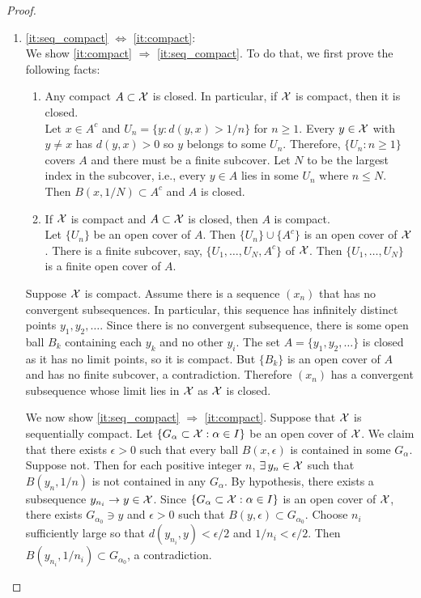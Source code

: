 \documentclass[12pt]{article}
\begin{document}
\begin{proof}
\begin{enumerate}[1)]
\item \ref{it:seq_compact} $\Leftrightarrow$ \ref{it:compact}:\\
We show \ref{it:compact} $\Rightarrow$ \ref{it:seq_compact}. To do that, we first prove the following facts:
\begin{enumerate}
	\item Any compact $A \subset \mathcal{X}$ is closed. In particular, if $\mathcal{X}$ is compact, then it is closed.\\
	Let $x\in A^c$ and $U_n = \{y : d(y,x) > 1/n\}$ for $n\geq 1$. Every $y\in\mathcal{X}$ with $y\ne x$ has $d(y,x)>0$ so $y$ belongs to some $U_n$. Therefore, $\{U_n : n\geq 1\}$ covers $A$ and there must be a finite subcover. Let $N$ to be the largest index in the subcover, i.e., every $y\in A$ lies in some $U_n$ where $n\leq N$. Then $B(x,1/N) \subset A^c$ and $A$ is closed.
	\item If $\mathcal{X}$ is compact and $A\subset\mathcal{X}$ is closed, then $A$ is compact.\\
	Let $\{U_n\}$ be an open cover of $A$. Then $\{U_n\}\cup\{ A^c\}$ is an open cover of $\mathcal{X}$. There is a finite subcover, say, $\{U_1,\ldots,U_N,A^c\}$ of $\mathcal{X}$. Then $\{U_1,\ldots,U_N\}$ is a finite open cover of $A$.
\end{enumerate}
Suppose $\mathcal{X}$ is compact. Assume there is a sequence $(x_n)$ that has no convergent subsequences. In particular, this sequence has infinitely distinct points $y_1, y_2, \ldots$. Since there is no convergent subsequence, there is some open ball $B_k$ containing each $y_k$ and no other $y_i$. The set $A=\{y_1,y_2,\ldots\}$ is closed as it has no limit points, so it is compact. But $\{B_k\}$ is an open cover of $A$ and has no finite subcover, a contradiction. Therefore $(x_n)$ has a convergent subsequence whose limit lies in $\mathcal{X}$ as $\mathcal{X}$ is closed.

We now show \ref{it:seq_compact} $\Rightarrow$ \ref{it:compact}. Suppose that $\mathcal{X}$ is sequentially compact. Let $\{G_\alpha\subset \mathcal{X} : \alpha \in I\}$ be an open cover of $\mathcal{X}$. We claim that there exists $\epsilon > 0 $ such that every ball $B(x,\epsilon)$ is contained in some $G_\alpha$. Suppose not. Then for each positive integer $n$, $\exists y_n\in\calX$ such that $B(y_n,1/n)$ is not contained in any $G_\alpha$. By hypothesis, there exists a subsequence $y_{n_i} \to y \in\mathcal{X}$. Since $\{G_\alpha\subset \mathcal{X} : \alpha \in I\}$ is an open cover of $\mathcal{X}$, there exists $G_{\alpha_0} \ni y$ and $\epsilon>0$ such that $B(y,\epsilon) \subset G_{\alpha_0}$. Choose $n_i$ sufficiently large so that $d(y_{n_i},y) < \epsilon/2$ and $1/n_i<\epsilon/2$. Then $B(y_{n_i},1/n_i)\subset G_{\alpha_0}$, a contradiction.


\end{enumerate}
\end{proof}
\end{document}
